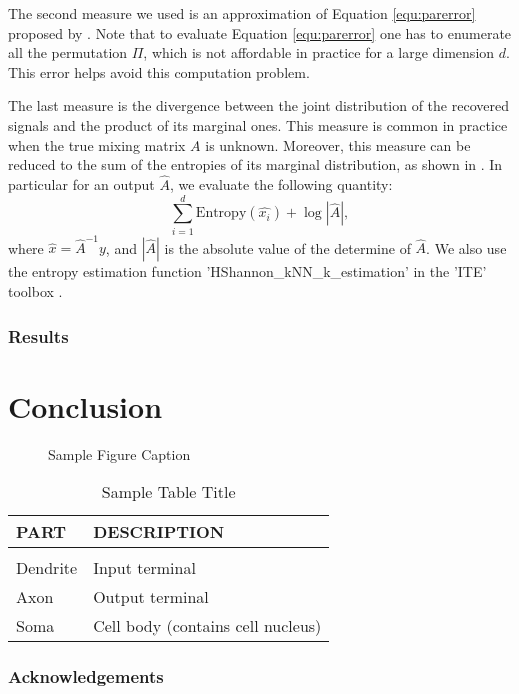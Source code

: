 \documentclass[twoside]{article}
\theoremstyle{definition}
\begin{document}
The second measure we used is an approximation of Equation \eqref{equ:parerror} proposed by \citet{comon1994independent}. 
Note that to evaluate Equation \eqref{equ:parerror} one has to enumerate all the permutation $\Pi$, which is not affordable in practice for a large dimension $d$. 
This error helps avoid this computation problem. 

The last measure is the divergence between the joint distribution of the recovered signals and the product of its marginal ones. 
This measure is common in practice when the true mixing matrix $A$ is unknown. 
Moreover, this measure can be reduced to the sum of the entropies of its marginal distribution, as shown in \cite{Learned-Miller:2003:IUS:945365.964306}. 
In particular for an output $\widehat{A}$, we evaluate the following quantity:
\begin{equation}
\sum_{i = 1}^{d} \text{Entropy}(\widehat{x_i}) + \log |\widehat{A}|,
\end{equation}
where $\widehat{x} = \widehat{A}^{-1}y$, and $|\widehat{A}|$ is the absolute value of the determine of $\widehat{A}$. We also use the entropy estimation function 'HShannon\_kNN\_k\_estimation' in the 'ITE' toolbox \cite{szabo14information}.

\subsubsection{Results}


\section{Conclusion}

\begin{figure}[h]
\vspace{.3in}
\centerline{}
\vspace{.3in}
\caption{Sample Figure Caption}
\end{figure}


\begin{table}[h]
\caption{Sample Table Title} \label{sample-table}
\begin{center}
\begin{tabular}{ll}
{\bf PART}  &{\bf DESCRIPTION} \\
\hline \\
Dendrite         &Input terminal \\
Axon             &Output terminal \\
Soma             &Cell body (contains cell nucleus) \\
\end{tabular}
\end{center}
\end{table}
\fi

\subsubsection*{Acknowledgements}





\newpage

\end{document}
